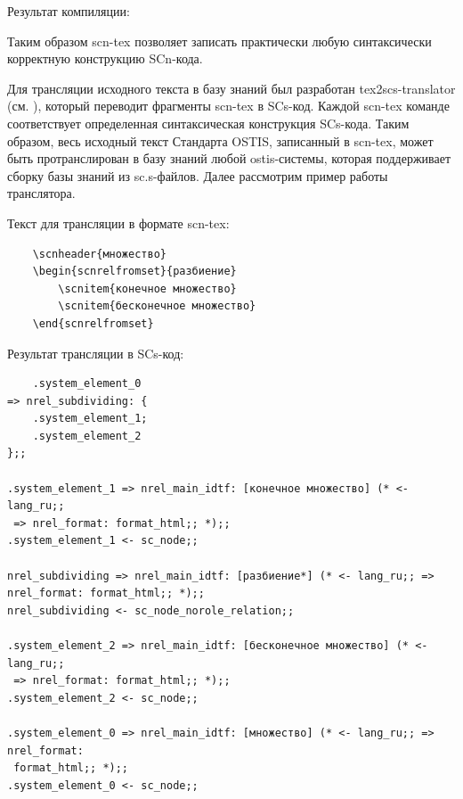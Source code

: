 \bigskip

Результат компиляции:

\begin{SCn}
\end{SCn}

\bigskip

Таким образом scn-tex позволяет записать практически любую синтаксически корректную конструкцию SCn-кода.

Для трансляции исходного текста в базу знаний был разработан tex2scs-translator (см. ), который переводит фрагменты scn-tex в SCs-код. Каждой scn-tex команде соответствует определенная синтаксическая конструкция SCs-кода. Таким образом, весь исходный текст Стандарта OSTIS, записанный в scn-tex, может быть протранслирован в базу знаний любой ostis-системы, которая поддерживает сборку базы знаний из sc.s-файлов. Далее рассмотрим пример работы транслятора.

Текст для трансляции в формате scn-tex:

\begin{verbatim}
	\scnheader{множество}
	\begin{scnrelfromset}{разбиение}
		\scnitem{конечное множество}
		\scnitem{бесконечное множество}
	\end{scnrelfromset}
\end{verbatim}

\bigskip

Результат трансляции в SCs-код:

\begin{verbatim}
	.system_element_0
=> nrel_subdividing: {
	.system_element_1;
	.system_element_2
};;

.system_element_1 => nrel_main_idtf: [конечное множество] (* <- lang_ru;;
 => nrel_format: format_html;; *);;
.system_element_1 <- sc_node;;

nrel_subdividing => nrel_main_idtf: [разбиение*] (* <- lang_ru;; => 
nrel_format: format_html;; *);;
nrel_subdividing <- sc_node_norole_relation;;

.system_element_2 => nrel_main_idtf: [бесконечное множество] (* <- lang_ru;;
 => nrel_format: format_html;; *);;
.system_element_2 <- sc_node;;

.system_element_0 => nrel_main_idtf: [множество] (* <- lang_ru;; => nrel_format:
 format_html;; *);;
.system_element_0 <- sc_node;;

	\end{verbatim}
%